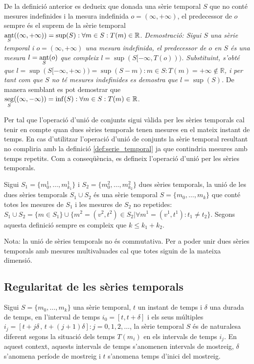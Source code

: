 De la definició anterior es dedueix que donada una sèrie temporal $S$
que no conté mesures indefinides i la mesura indefinida
$o=(\infty,+\infty)$, el predecessor de $o$ sempre és el suprem de la
sèrie temporal $\operatorname*{ant}\limits_S( (\infty,+\infty) ) = \sup(S): \forall
m\in S: T(m)\in\mathbb{R}$.  %
\emph{Demostració: Sigui $S$ una sèrie temporal i $o=(\infty,+\infty)$
  una mesura indefinida, el predecessor de $o$ en $S$ és una mesura
  $l=\operatorname*{ant}\limits_S(o)$ que compleix
  $l=\sup(S[-\infty,T(o)))$. Substituint, s'obté que
  $l=\sup(S[-\infty,+\infty))=\sup(S-m):m\in S:T(m)=+\infty \notin
  \mathbb{R}$, i per tant com que $S$ no té mesures indefinides es
  demostra que $l=\sup(S)$.  } De manera semblant es pot demostrar que
$\operatorname*{seg}\limits_S( (\infty,-\infty) ) = \inf(S): \forall m\in S:
T(m)\in\mathbb{R}$.




Per tal que l'operació d'unió de conjunts sigui vàlida per les sèries
temporals cal tenir en compte quan dues sèries temporals tenen mesures
en el mateix instant de temps. En cas d'utilitzar l'operació d'unió de
conjunts la sèrie temporal resultant no compliria amb la definició
\ref{def:serie_temporal} ja que contindria mesures amb temps
repetits. Com a conseqüència, es defineix l'operació d'unió per les
sèries temporals.

\begin{definition}[unió]
  Sigui $S_1=\{m_0^1, \dotsc, m_{k_1}^1\}$ i $S_2=\{m_0^2, \dotsc,
  m_{k_2}^2\}$ dues sèries temporals, la unió de les dues sèries
  temporals $S_1 \cup S_2$ és una sèrie temporal $S=\{m_0, \dotsc,
  m_k\}$ que conté totes les mesures de $S_1$ i les mesures de $S_2$
  no repetides: $S_1 \cup S_2 = \{ m \in S_1 \} \cup \{ m^2 =
  (v^2,t^2) \in S_2 | \forall m^1 = (v^1,t^1) : t_1 \neq t_2
  \}$. Segons aquesta definició sempre es compleix que $k \leq k_1 +
  k_2$.

Nota: la unió de sèries temporals no és commutativa. Per a
  poder unir dues sèries temporals amb mesures multivaluades cal que
  totes siguin de la mateixa dimensió.
\end{definition}



\subsection{Regularitat de les sèries temporals} 

Sigui $S=\{m_0,\ldots,m_k\}$ una sèrie temporal, $t$ un instant de temps i $\delta$ una durada de temps, en l'interval de temps $i_0=[t,t+\delta]$ i els seus múltiples $i_j=[t+j\delta \,,\, t+(j+1)\delta]: j=0,1,2,\ldots$,  
la sèrie temporal $S$ és de naturalesa diferent segons la situació dels temps $T(m_i)$ en els intervals de temps $i_j$.
En aquest context, aquests intervals de temps s'anomenen intervals de mostreig, $\delta$ s'anomena període de mostreig i $t$ s'anomena temps d'inici del mostreig.

